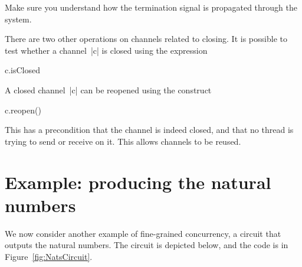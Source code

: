 \begin{instruction}
Make sure you understand how the termination signal is propagated through the
system. 
\end{instruction}

There are two other operations on channels related to closing. 
It is possible to test whether a channel~|c| is closed using the expression
%
\begin{scala}
  c.isClosed
\end{scala}
%
A closed channel~|c| can be reopened using the construct
\begin{scala}
  c.reopen()
\end{scala}
%
This has a precondition that the channel is indeed closed, and that no thread
is trying to send or receive on it.  This allows channels to be reused.



\section{Example: producing the natural numbers}

We now consider another example of fine-grained concurrency, a circuit that
outputs the natural numbers.  The circuit is depicted below, and the code is
in Figure~\ref{fig:NatsCircuit}. 

\begin{center}
\end{center}



